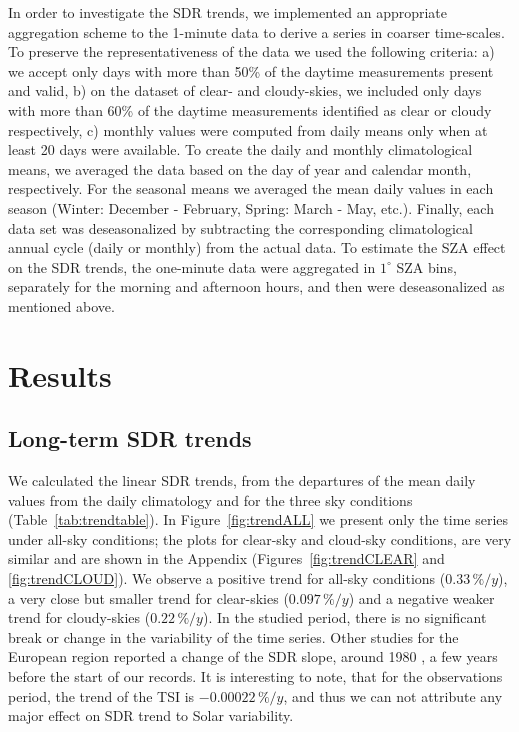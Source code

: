\documentclass[applsci,article,submit,moreauthors,pdftex]{Definitions/mdpi}
\begin{document}
In order to investigate the SDR trends, we implemented an appropriate
aggregation scheme to the 1-minute data to derive a series in coarser
time-scales. To preserve the representativeness of the data we used the
following criteria: a) we accept only days with more than 50\% of the
daytime measurements present and valid, b) on the dataset of clear- and
cloudy-skies, we included only days with more than 60\% of the daytime
measurements identified as clear or cloudy respectively, c) monthly
values were computed from daily means only when at least 20 days were
available. To create the daily and monthly climatological means, we
averaged the data based on the day of year and calendar month,
respectively. For the seasonal means we averaged the mean daily values
in each season (Winter: December - February, Spring: March - May, etc.).
Finally, each data set was deseasonalized by subtracting the
corresponding climatological annual cycle (daily or monthly) from the
actual data. To estimate the SZA effect on the SDR trends, the
one-minute data were aggregated in \(1^\circ\) SZA bins, separately for
the morning and afternoon hours, and then were deseasonalized as
mentioned above.

\hypertarget{results}{%
\section{Results}\label{results}}

\hypertarget{long-term-sdr-trends}{%
\subsection{Long-term SDR trends}\label{long-term-sdr-trends}}

We calculated the linear SDR trends, from the departures of the mean
daily values from the daily climatology and for the three sky conditions
(Table~\ref{tab:trendtable}). In Figure~\ref{fig:trendALL} we present
only the time series under all-sky conditions; the plots for clear-sky
and cloud-sky conditions, are very similar and are shown in the Appendix
(Figures~\ref{fig:trendCLEAR} and~ \ref{fig:trendCLOUD}). We observe a
positive trend for all-sky conditions (\(0.33\,\%/y\)), a very close but
smaller trend for clear-skies (\(0.097\,\%/y\)) and a negative weaker
trend for cloudy-skies (\(0.22\,\%/y\)). In the studied period, there is
no significant break or change in the variability of the time series.
Other studies for the European region reported a change of the SDR
slope, around 1980 \citep{Wild2021, Yuan2021, Ohmura2009}, a few years
before the start of our records. It is interesting to note, that for the
observations period, the trend of the TSI is \(-0.00022\,\%/y\), and
thus we can not attribute any major effect on SDR trend to Solar
variability.
\end{document}
